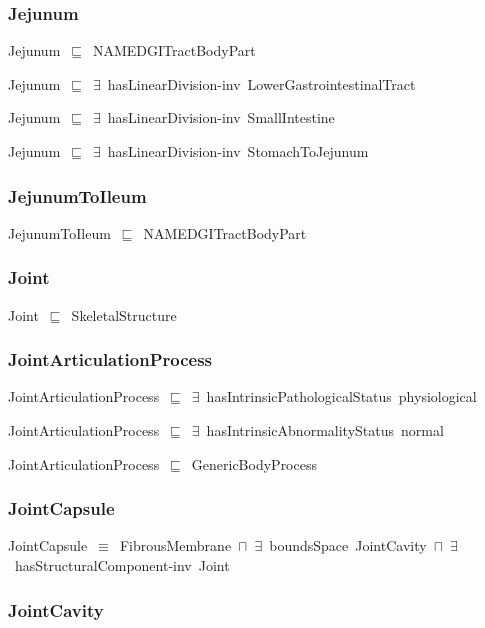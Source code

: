 \documentclass{article}
\begin{document}
\subsubsection*{Jejunum}

Jejunum~\ensuremath{\sqsubseteq}~NAMEDGITractBodyPart~

Jejunum~\ensuremath{\sqsubseteq}~\ensuremath{\exists}~hasLinearDivision-inv~LowerGastrointestinalTract~

Jejunum~\ensuremath{\sqsubseteq}~\ensuremath{\exists}~hasLinearDivision-inv~SmallIntestine~

Jejunum~\ensuremath{\sqsubseteq}~\ensuremath{\exists}~hasLinearDivision-inv~StomachToJejunum~

\subsubsection*{JejunumToIleum}

JejunumToIleum~\ensuremath{\sqsubseteq}~NAMEDGITractBodyPart~

\subsubsection*{Joint}

Joint~\ensuremath{\sqsubseteq}~SkeletalStructure~

\subsubsection*{JointArticulationProcess}

JointArticulationProcess~\ensuremath{\sqsubseteq}~\ensuremath{\exists}~hasIntrinsicPathologicalStatus~physiological~

JointArticulationProcess~\ensuremath{\sqsubseteq}~\ensuremath{\exists}~hasIntrinsicAbnormalityStatus~normal~

JointArticulationProcess~\ensuremath{\sqsubseteq}~GenericBodyProcess~

\subsubsection*{JointCapsule}

JointCapsule~\ensuremath{\equiv}~FibrousMembrane~\ensuremath{\sqcap}~\ensuremath{\exists}~boundsSpace~JointCavity~\ensuremath{\sqcap}~\ensuremath{\exists}~hasStructuralComponent-inv~Joint

\subsubsection*{JointCavity}
\end{document}

